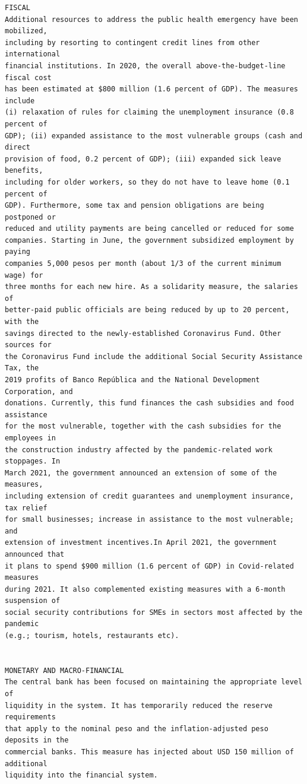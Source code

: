 \documentclass[10pt, letterpaper]{article}
\begin{document}
\begin{spacing}{1.4}
\begin{scriptsize}
\begin{spacing}{.85}
\begin{verbatim}
FISCAL
Additional resources to address the public health emergency have been mobilized,
including by resorting to contingent credit lines from other international
financial institutions. In 2020, the overall above-the-budget-line fiscal cost
has been estimated at $800 million (1.6 percent of GDP). The measures include
(i) relaxation of rules for claiming the unemployment insurance (0.8 percent of
GDP); (ii) expanded assistance to the most vulnerable groups (cash and direct
provision of food, 0.2 percent of GDP); (iii) expanded sick leave benefits,
including for older workers, so they do not have to leave home (0.1 percent of
GDP). Furthermore, some tax and pension obligations are being postponed or
reduced and utility payments are being cancelled or reduced for some
companies. Starting in June, the government subsidized employment by paying
companies 5,000 pesos per month (about 1/3 of the current minimum wage) for
three months for each new hire. As a solidarity measure, the salaries of
better-paid public officials are being reduced by up to 20 percent, with the
savings directed to the newly-established Coronavirus Fund. Other sources for
the Coronavirus Fund include the additional Social Security Assistance Tax, the
2019 profits of Banco República and the National Development Corporation, and
donations. Currently, this fund finances the cash subsidies and food assistance
for the most vulnerable, together with the cash subsidies for the employees in
the construction industry affected by the pandemic-related work stoppages. In
March 2021, the government announced an extension of some of the measures,
including extension of credit guarantees and unemployment insurance, tax relief
for small businesses; increase in assistance to the most vulnerable; and
extension of investment incentives.In April 2021, the government announced that
it plans to spend $900 million (1.6 percent of GDP) in Covid-related measures
during 2021. It also complemented existing measures with a 6-month suspension of
social security contributions for SMEs in sectors most affected by the pandemic
(e.g.; tourism, hotels, restaurants etc).


MONETARY AND MACRO-FINANCIAL
The central bank has been focused on maintaining the appropriate level of
liquidity in the system. It has temporarily reduced the reserve requirements
that apply to the nominal peso and the inflation-adjusted peso deposits in the
commercial banks. This measure has injected about USD 150 million of additional
liquidity into the financial system.



\end{verbatim}
\end{spacing}
\end{scriptsize}
\end{spacing}
\end{document}

